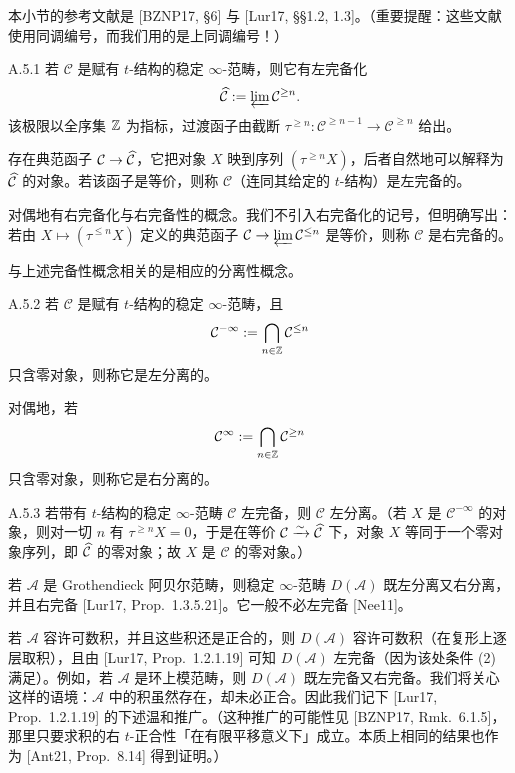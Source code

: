 本小节的参考文献是 [BZNP17, §6] 与 [Lur17, §§1.2, 1.3]。（重要提醒：这些文献使用同调编号，而我们用的是上同调编号！）

\begin{defn}{A.5.1}\label{defn:a4-17-A-5-1}
若 $\mathcal C$ 是赋有 $t$-结构的稳定 $\infty$-范畴，则它有左完备化
\[
\widehat{\mathcal C}:=\varprojlim\mathcal C^{\geq n}.
\]
该极限以全序集 $\mathbb{Z}$ 为指标，过渡函子由截断 $\tau^{\geq n}:\mathcal C^{\geq n-1}\to\mathcal C^{\geq n}$ 给出。

存在典范函子 $\mathcal C\to\widehat{\mathcal C}$，它把对象 $X$ 映到序列 $(\tau^{\geq n}X)$，后者自然地可以解释为 $\widehat{\mathcal C}$ 的对象。若该函子是等价，则称 $\mathcal C$（连同其给定的 $t$-结构）是左完备的。

对偶地有右完备化与右完备性的概念。我们不引入右完备化的记号，但明确写出：若由 $X\mapsto(\tau^{\leq n}X)$ 定义的典范函子 $\mathcal C\to\varprojlim\mathcal C^{\leq n}$ 是等价，则称 $\mathcal C$ 是右完备的。

与上述完备性概念相关的是相应的分离性概念。
\end{defn}

\begin{defn}{A.5.2}\label{defn:a4-17-A-5-2}
若 $\mathcal C$ 是赋有 $t$-结构的稳定 $\infty$-范畴，且
\[
\mathcal C^{-\infty}:=\bigcap_{n\in\mathbb{Z}}\mathcal C^{\leq n}
\]
只含零对象，则称它是左分离的。


对偶地，若
\[
\mathcal C^{\infty}:=\bigcap_{n\in\mathbb{Z}}\mathcal C^{\geq n}
\]
只含零对象，则称它是右分离的。
\end{defn}

\begin{rem}{A.5.3}\label{rem:a4-17-A-5-3}
若带有 $t$-结构的稳定 $\infty$-范畴 $\mathcal C$ 左完备，则 $\mathcal C$ 左分离。（若 $X$ 是 $\mathcal C^{-\infty}$ 的对象，则对一切 $n$ 有 $\tau^{\geq n}X=0$，于是在等价 $\mathcal C\xrightarrow{\sim}\widehat{\mathcal C}$ 下，对象 $X$ 等同于一个零对象序列，即 $\widehat{\mathcal C}$ 的零对象；故 $X$ 是 $\mathcal C$ 的零对象。）
\end{rem}

若 $\mathcal A$ 是 Grothendieck 阿贝尔范畴，则稳定 $\infty$-范畴 $D(\mathcal A)$ 既左分离又右分离，并且右完备 [Lur17, Prop.~1.3.5.21]。它一般不必左完备 [Nee11]。

若 $\mathcal A$ 容许可数积，并且这些积还是正合的，则 $D(\mathcal A)$ 容许可数积（在复形上逐层取积），且由 [Lur17, Prop.~1.2.1.19] 可知 $D(\mathcal A)$ 左完备（因为该处条件 (2) 满足）。例如，若 $\mathcal A$ 是环上模范畴，则 $D(\mathcal A)$ 既左完备又右完备。我们将关心这样的语境：$\mathcal A$ 中的积虽然存在，却未必正合。因此我们记下 [Lur17, Prop.~1.2.1.19] 的下述温和推广。（这种推广的可能性见 [BZNP17, Rmk.~6.1.5]，那里只要求积的右 $t$-正合性「在有限平移意义下」成立。本质上相同的结果也作为 [Ant21, Prop.~8.14] 得到证明。）


